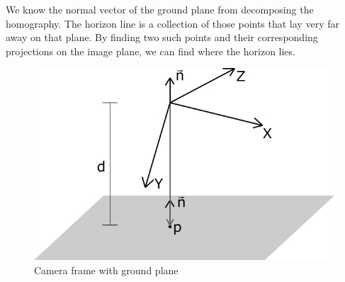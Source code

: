 We know the normal vector of the ground plane from decomposing the homography. The horizon line is a collection of those points that lay very far away on that plane. By finding two such points and their corresponding projections on the image plane, we can find where the horizon lies.\bigskip

\begin{figure}
    \centering
    \includegraphics[width=1\textwidth]{figures/plane_with_p.png}
    \caption{Camera frame with ground plane}
    \label{fig:plane_with_d}
\end{figure}

